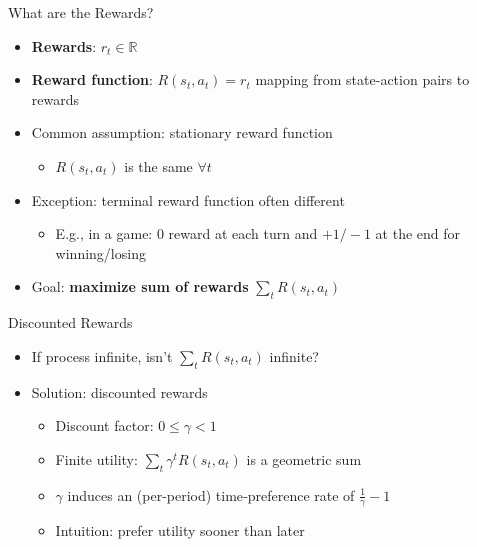 \documentclass[11pt,table]{beamer}
\begin{document}
\begin{frame}{What are the Rewards?}

\begin{itemize}
    \item \textbf{Rewards}: $r_{t} \in \mathbb{R}$


\item \textbf{Reward function}: $R\left(s_{t}, a_{t}\right)=r_{t}$ mapping from state-action pairs to rewards

\item Common assumption: \textcolor{red1}{stationary} reward function 

\begin{itemize}
\item $R\left(s_{t}, a_{t}\right)$ is the same $\forall t$
\end{itemize}
\item Exception: terminal reward function often different
\begin{itemize}
    
\item E.g., in a game: 0 reward at each turn and $+1 /-1$ at the end for winning/losing
\end{itemize}
\item Goal: \textbf{maximize sum of rewards} $\sum_{t} R\left(s_{t}, a_{t}\right)$
\end{itemize}
    
\end{frame}

\begin{frame}{Discounted Rewards}

\begin{itemize}
    \item If process infinite, isn't $\sum_{t} R\left(s_{t}, a_{t}\right)$ infinite?

\item Solution: \textcolor{red1}{discounted} rewards

\begin{itemize}
     

\item Discount factor: $0 \leq \gamma<1$
\item Finite utility: $\sum_{t} \gamma^{t} R\left(s_{t}, a_{t}\right)$ is a geometric sum

\item $\gamma$ induces an (per-period) time‐preference rate of $\frac{1}{\gamma}-1$
\item Intuition: prefer utility sooner than later
\end{itemize}
\end{itemize}  
\end{frame}
\end{document}
